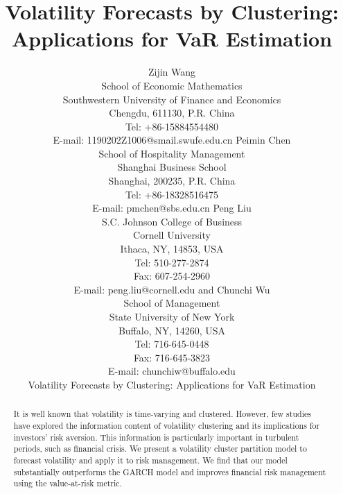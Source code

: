 \documentclass[preprint,12pt,authoryear]{elsarticle}
\begin{document}

\begin{frontmatter}

\title{ Volatility Forecasts by Clustering: Applications for VaR Estimation } %

\vskip 1.5cm

\author{ {\large Zijin Wang}\\ School of Economic Mathematics \\
Southwestern University of Finance and Economics\\ Chengdu,
611130, P.R. China \\
 Tel: +86-15884554480\\ E-mail: 1190202Z1006@smail.swufe.edu.cn \vskip 0.5cm
{\large Peimin Chen{\small*}}\\School of Hospitality Management\\Shanghai Business School \\
Shanghai, 200235, P.R. China \\
 Tel: +86-18328516475\\ E-mail: pmchen@sbs.edu.cn  \vskip 0.5cm
{\large Peng Liu }\\S.C. Johnson College of Business\\Cornell University\\
Ithaca, NY, 14853, USA\\
Tel: 510-277-2874\\ Fax: 607-254-2960\\  E-mail:
peng.liu@cornell.edu
 \vskip 0.5cm and  \vskip 0.5cm
{\large Chunchi Wu{\small*}} \\ School of Management\\
  State University of New York\\
  Buffalo, NY, 14260, USA\\
  Tel: 716-645-0448\\ Fax: 716-645-3823\\
  E-mail: chunchiw@buffalo.edu
\newpage
\begin{center}
{\Large Volatility Forecasts by Clustering: Applications for VaR Estimation }
\end{center}
  }
\begin{abstract}
It is well known that volatility is time-varying and clustered. However, few studies have explored the information content of volatility clustering and its implications for investors' risk aversion.  This information is particularly important in turbulent periods, such as financial crisis. We present a volatility cluster partition model to forecast volatility and apply it to risk management. We find that our model substantially outperforms the GARCH model and improves financial risk management using the value-at-risk metric.
\end{abstract}


\end{frontmatter}
\end{document}
